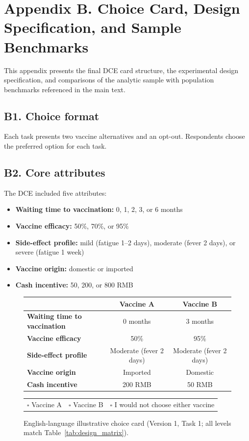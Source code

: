 \section*{Appendix B. Choice Card, Design Specification, and Sample Benchmarks}
\label{app:B}

This appendix presents the final DCE card structure, the experimental design specification, and comparisons of the analytic sample with population benchmarks referenced in the main text.

\subsection*{B1. Choice format}

Each task presents two vaccine alternatives and an opt-out. Respondents choose the preferred option for each task.

\subsection*{B2. Core attributes}

The DCE included five attributes:
\begin{itemize}
    \item \textbf{Waiting time to vaccination:} 0, 1, 2, 3, or 6 months
    \item \textbf{Vaccine efficacy:} 50\%, 70\%, or 95\%
    \item \textbf{Side-effect profile:} mild (fatigue 1--2 days), moderate (fever 2 days), or severe (fatigue 1 week)
    \item \textbf{Vaccine origin:} domestic or imported
    \item \textbf{Cash incentive:} 50, 200, or 800 RMB
\end{itemize}

\begin{figure}[H]
    \centering
    \small
    \begin{tabular}{@{}p{4.5cm}cc@{}}
        \toprule
        & \textbf{Vaccine A} & \textbf{Vaccine B} \\
        \midrule
        \textbf{Waiting time to vaccination} & 0 months & 3 months \\
        \textbf{Vaccine efficacy} & 50\% & 95\% \\
        \textbf{Side-effect profile} & Moderate (fever 2 days) & Moderate (fever 2 days) \\
        \textbf{Vaccine origin} & Imported & Domestic \\
        \textbf{Cash incentive} & 200 RMB & 50 RMB \\
        \bottomrule
    \end{tabular}
    
    \vspace{0.8em}
    \begin{tabular}{@{}ccc@{}}
        $\square$ Vaccine A & $\square$ Vaccine B & $\square$ I would not choose either vaccine \\
    \end{tabular}
    \caption{English-language illustrative choice card (Version 1, Task 1; all levels match Table~\ref{tab:design_matrix}).}
\end{figure}

